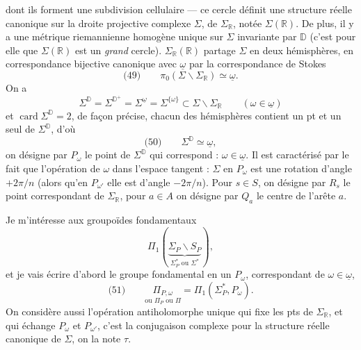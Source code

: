 \documentclass[11pt,a4paper]{article}
\begin{document}
dont ils forment une subdivision cellulaire --- ce cercle définit une structure
réelle canonique sur la droite projective complexe $\Sigma$,
\struck{\ill{}} de $\Sigma_{\mathbb{R}}$, notée $\Sigma(\mathbb{R})$.
 De plus, il y a une métrique riemannienne
homogène unique sur $\Sigma$ invariante par $\mathbb{D}$ (c'est pour elle que
$\Sigma(\mathbb{R})$ est un \emph{grand} cercle).
$\Sigma_{\mathbb{R}}(\mathbb{R})$ partage $\Sigma$ en deux hémisphères,
\struck{\ill{}} en correspondance bijective canonique avec $\underline{\omega}$
par la correspondance de Stokes
\[
  \text{(49)} \qquad \pi_0(\Sigma \smallsetminus \Sigma_{\mathbb{R}}) \simeq
  \underline{\omega} .
\]
On a
\[
  \Sigma^{\mathbb{D}} = \Sigma^{\mathbb{D}^+} = \Sigma^{\underline{\omega}}
  = \Sigma^{\{\omega\}} \subset \Sigma \smallsetminus \Sigma_{\mathbb{R}}
  \qquad (\omega \in \underline{\omega})
\]
et $\operatorname{card} \Sigma^{\mathbb{D}} = 2$, de façon précise, chacun des
hémisphères  contient un pt et un seul de $\Sigma^{\mathbb{D}}$,
d'où
\[
  \text{(50)} \qquad \Sigma^{\mathbb{D}} \simeq \underline{\omega} ,
\]
on désigne par $P_\omega$ le point de $\Sigma^{\mathbb{D}}$ qui correspond :
$\omega \in \underline{\omega}$. Il est caractérisé par le fait que l'opération de
$\omega$ dans l'espace tangent : $\Sigma$ en $P_\omega$ est une rotation d'angle
$+2\pi/n$ (alors qu'en $P_{\omega'}$ elle est d'angle $-2\pi/n$). Pour $s \in S$,
on désigne par $R_s$ le point correspondant de $\Sigma_{\mathbb{R}}$, pour
$a \in A$ on désigne par $Q_a$ le centre de l'arête $a$.


Je m'intéresse aux groupoïdes fondamentaux
\[
  \Pi_1(\underbrace{\Sigma_P \smallsetminus S_P}_{\Sigma_P^{*} \text{ ou } \Sigma^{*}}) ,
\]
et je vais écrire d'abord le groupe fondamental en un $P_\omega$, correspondant
  de $\omega \in \underline{\omega}$, 
\[
  \text{(51)} \qquad
  \underset{\text{ou } \Pi_P \text{ ou } \Pi}{\Pi_{P,\omega}}
  = \Pi_1(\Sigma_P^{*}, P_\omega) .
\]
On considère aussi l'opération antiholomorphe unique qui fixe les pts de
$\Sigma_{\mathbb{R}}$, et qui échange $P_\omega$ et $P_{\omega'}$, c'est la
conjugaison complexe pour la structure réelle canonique de $\Sigma$, on la
note $\tau$.
\end{document}
